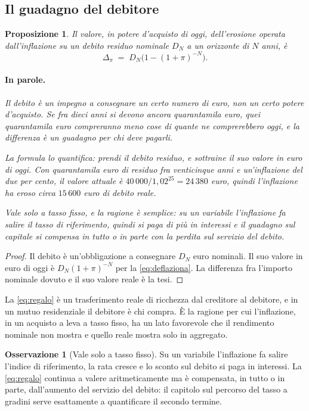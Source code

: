 \documentclass[11pt,a4paper]{article}
\theoremstyle{definition}
\newtheorem{osservazione}[definizione]{Osservazione}
\theoremstyle{plain}
\newtheorem{proposizione}[definizione]{Proposizione}
\begin{document}
\subsection{Il guadagno del debitore}

\begin{proposizione}
Il valore, in potere d'acquisto di oggi, dell'erosione operata dall'inflazione su un debito residuo nominale $D_N$ a un orizzonte di $N$ anni, è
\begin{equation}
\Delta_\pi \;=\; D_N\Big(1 - (1+\pi)^{-N}\Big).
\label{eq:regalo}
\end{equation}

\paragraph{In parole.} Il debito è un impegno a consegnare un certo numero di euro, non un certo potere d'acquisto. Se fra dieci anni si devono ancora quarantamila euro, quei quarantamila euro compreranno meno cose di quante ne comprerebbero oggi, e la differenza è un guadagno per chi deve pagarli.

La formula lo quantifica: prendi il debito residuo, e sottraine il suo valore in euro di oggi. Con quarantamila euro di residuo fra venticinque anni e un'inflazione del due per cento, il valore attuale è $40\,000/1{,}02^{25} = 24\,380$ euro, quindi l'inflazione ha eroso circa $15\,600$ euro di debito reale.

Vale solo a tasso fisso, e la ragione è semplice: su un variabile l'inflazione fa salire il tasso di riferimento, quindi si paga di più in interessi e il guadagno sul capitale si compensa in tutto o in parte con la perdita sul servizio del debito.
\end{proposizione}

\begin{proof}
Il debito è un'obbligazione a consegnare $D_N$ euro nominali. Il suo valore in euro di oggi è $D_N(1+\pi)^{-N}$ per la \eqref{eq:deflaziona}. La differenza fra l'importo nominale dovuto e il suo valore reale è la tesi.
\end{proof}

La \eqref{eq:regalo} è un trasferimento reale di ricchezza dal creditore al debitore, e in un mutuo residenziale il debitore è chi compra. È la ragione per cui l'inflazione, in un acquisto a leva a tasso fisso, ha un lato favorevole che il rendimento nominale non mostra e quello reale mostra solo in aggregato.

\begin{osservazione}[Vale solo a tasso fisso]
Su un variabile l'inflazione fa salire l'indice di riferimento, la rata cresce e lo sconto sul debito si paga in interessi. La \eqref{eq:regalo} continua a valere aritmeticamente ma è compensata, in tutto o in parte, dall'aumento del servizio del debito: il capitolo sul percorso del tasso a gradini serve esattamente a quantificare il secondo termine.
\end{osservazione}
\end{document}
